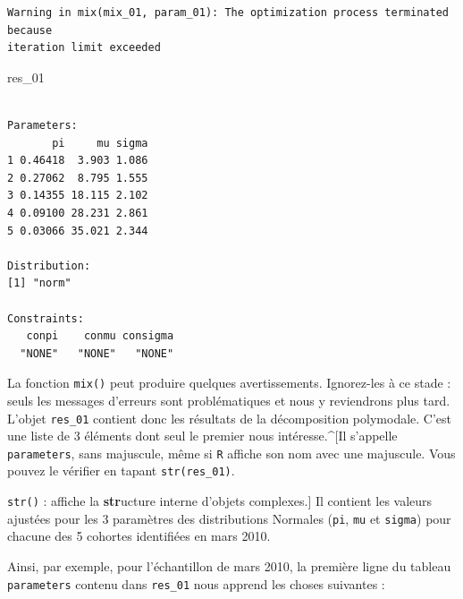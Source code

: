 \documentclass[
  french,
  a4paper,
  DIV=11,
  numbers=noendperiod,
  oneside]{scrreprt}
\newenvironment{Shaded}{}{}
\newcommand{\NormalTok}[1]{\textcolor[rgb]{0.14,0.16,0.18}{#1}}
\begin{document}
\begin{tcolorbox}
\begin{verbatim}
Warning in mix(mix_01, param_01): The optimization process terminated because
iteration limit exceeded
\end{verbatim}

\begin{Shaded}
\begin{Highlighting}[]
\NormalTok{res\_01}
\end{Highlighting}
\end{Shaded}

\begin{verbatim}

Parameters:
       pi     mu sigma
1 0.46418  3.903 1.086
2 0.27062  8.795 1.555
3 0.14355 18.115 2.102
4 0.09100 28.231 2.861
5 0.03066 35.021 2.344

Distribution:
[1] "norm"

Constraints:
   conpi    conmu consigma 
  "NONE"   "NONE"   "NONE" 
\end{verbatim}


La fonction \texttt{mix()} peut produire quelques avertissements.
Ignorez-les à ce stade : seuls les messages d'erreurs sont
problématiques et nous y reviendrons plus tard. L'objet \texttt{res\_01}
contient donc les résultats de la décomposition polymodale. C'est une
liste de 3 éléments dont seul le premier nous intéresse.\^{}{[}Il
s'appelle \texttt{parameters}, sans majuscule, même si \texttt{R}
affiche son nom avec une majuscule. Vous pouvez le vérifier en tapant
\texttt{str(res\_01)}.

\texttt{str()} : affiche la \textbf{str}ucture interne d'objets
complexes.{]} Il contient les valeurs ajustées pour les 3 paramètres des
distributions Normales (\texttt{pi}, \texttt{mu} et \texttt{sigma}) pour
chacune des 5 cohortes identifiées en mars 2010.

Ainsi, par exemple, pour l'échantillon de mars 2010, la première ligne
du tableau \texttt{parameters} contenu dans \texttt{res\_01} nous
apprend les choses suivantes :


\end{tcolorbox}
\end{document}

